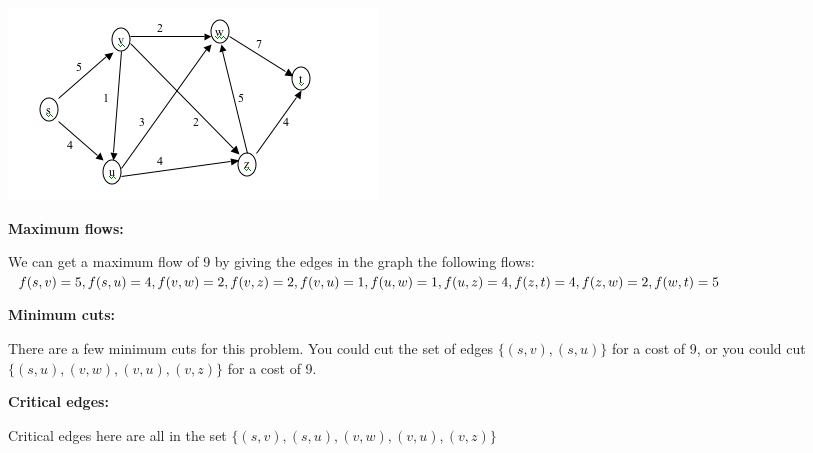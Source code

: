 \documentclass[10pt]{article}
\begin{document}
\begin{problems}


  \problem %

  \includegraphics{graph}

  {\vskip 0.1in \noindent\bf Maximum flows:}

    We can get a maximum flow of 9 by giving the edges in the graph the following flows:\\
    $f(s, v) = 5,\\
     f(s, u) = 4,\\
     f(v, w) = 2,\\
     f(v, z) = 2,\\
     f(v, u) = 1,\\
     f(u, w) = 1,\\
     f(u, z) = 4,\\
     f(z, t) = 4,\\
     f(z, w) = 2,\\
     f(w, t) = 5\\$

  {\vskip 0.1in \noindent\bf Minimum cuts:}

    There are a few minimum cuts for this problem. You could cut the set of edges $\{(s, v), (s, u)\}$ for a cost of 9, 
        or you could cut $\{(s, u), (v, w), (v, u), (v, z)\}$ for a cost of 9.

  {\vskip 0.1in \noindent\bf Critical edges:}

    Critical edges here are all in the set $\{(s, v), (s, u), (v, w), (v, u), (v, z)\}$
  

  \newpage 

  \problem %


\end{problems}
\end{document}
